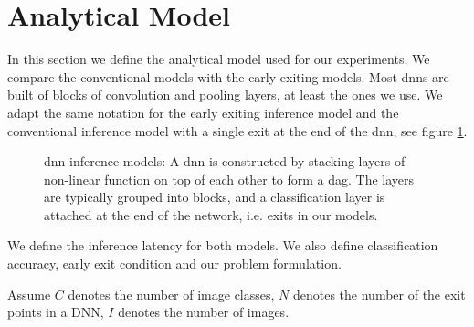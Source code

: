 \newpage\section{Analytical Model} \label{sec:ee-metrics}

In this section we define the analytical model used for our experiments. We compare the conventional models with the early exiting models. Most \gls{dnn}s are built of blocks of convolution and pooling layers, at least the ones we use. We adapt the same notation for the early exiting inference model and the conventional inference model with a single exit at the end of the \gls{dnn}, see figure \ref{fig:inference_models}.
	\begin{figure}
		\centering
		\captionsetup[subfigure]{justification=centering, farskip=1pt,captionskip=1pt}
		\hfill
		\caption[\gls{dnn} structure]{\gls{dnn} inference models: A \gls{dnn} is constructed by stacking layers of non-linear function on top of each other to form a \gls{dag}. The layers are typically grouped into blocks, and a classification layer is attached at the end of the network, i.e. exits in our models.}
		\label{fig:inference_models}
	\end{figure}	
	We define the inference latency for both models. We also define classification accuracy, early exit condition and our problem formulation. 
	
	Assume $ C $ denotes the number of image classes, $ N $ denotes the number of the exit points in a DNN, $ I $ denotes the number of images.

